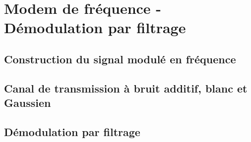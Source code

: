 \section{Modem de fréquence - Démodulation par filtrage}

\subsection{Construction du signal modulé en fréquence}


\subsection{Canal de transmission à bruit additif, blanc et Gaussien}


\subsection{Démodulation par filtrage}
